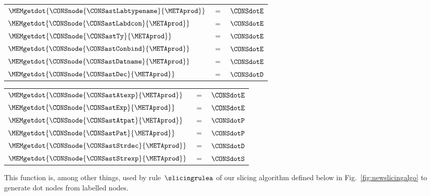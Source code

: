 \documentclass{jfp1}
\newcommand{\sizeintablesp}{footnotesize}
\begin{document}
\begin{center}
  \begin{\sizeintablesp}
    \begin{tabular}[t]{lll}
      $\MEMgetdot{\CONSnode{\CONSastLabtypename}{\METAprod}}$
      & $=$
      & $\CONSdotE$
      \\

      $\MEMgetdot{\CONSnode{\CONSastLabdcon}{\METAprod}}$
      & $=$
      & $\CONSdotE$
      \\

      $\MEMgetdot{\CONSnode{\CONSastTy}{\METAprod}}$
      & $=$
      & $\CONSdotE$
      \\

      $\MEMgetdot{\CONSnode{\CONSastConbind}{\METAprod}}$
      & $=$
      & $\CONSdotE$
      \\

      $\MEMgetdot{\CONSnode{\CONSastDatname}{\METAprod}}$
      & $=$
      & $\CONSdotE$
      \\

      $\MEMgetdot{\CONSnode{\CONSastDec}{\METAprod}}$
      & $=$
      & $\CONSdotD$
      \\
    \end{tabular}
    \hspace{0.3in}
    \begin{tabular}[t]{lll}
      $\MEMgetdot{\CONSnode{\CONSastAtexp}{\METAprod}}$
      & $=$
      & $\CONSdotE$
      \\

      $\MEMgetdot{\CONSnode{\CONSastExp}{\METAprod}}$
      & $=$
      & $\CONSdotE$
      \\

      $\MEMgetdot{\CONSnode{\CONSastAtpat}{\METAprod}}$
      & $=$
      & $\CONSdotP$
      \\

      $\MEMgetdot{\CONSnode{\CONSastPat}{\METAprod}}$
      & $=$
      & $\CONSdotP$
      \\

      $\MEMgetdot{\CONSnode{\CONSastStrdec}{\METAprod}}$
      & $=$
      & $\CONSdotD$
      \\

      $\MEMgetdot{\CONSnode{\CONSastStrexp}{\METAprod}}$
      & $=$
      & $\CONSdotS$
    \end{tabular}
  \end{\sizeintablesp}
\end{center}

This function is, among other things, used by rule~$\slicingrulea$ of
our slicing algorithm defined below in Fig.~\ref{fig:newslicingalgo}
to generate dot nodes from labelled nodes.
\end{document}
